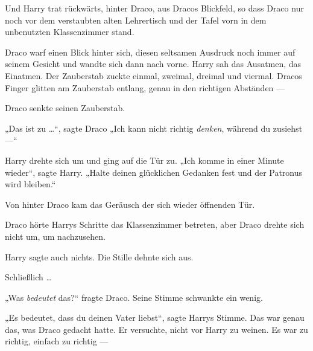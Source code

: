 Und Harry trat rückwärts, hinter Draco, aus Dracos Blickfeld, so dass Draco nur noch vor dem verstaubten alten Lehrertisch und der Tafel vorn in dem unbenutzten Klassenzimmer stand.

Draco warf einen Blick hinter sich, diesen seltsamen Ausdruck noch immer auf seinem Gesicht und wandte sich dann nach vorne. Harry sah das Ausatmen, das Einatmen. Der Zauberstab zuckte einmal, zweimal, dreimal und viermal. Dracos Finger glitten am Zauberstab entlang, genau in den richtigen Abständen —

Draco senkte seinen Zauberstab.

„Das ist zu …“, sagte Draco
„Ich kann nicht richtig \emph{denken}, während du zusiehst —“

Harry drehte sich um und ging auf die Tür zu.
„Ich komme in einer Minute wieder“, sagte Harry.
„Halte deinen glücklichen Gedanken fest und der Patronus wird bleiben.“

\later

Von hinter Draco kam das Geräusch der sich wieder öffnenden Tür.

Draco hörte Harrys Schritte das Klassenzimmer betreten, aber Draco drehte sich nicht um, um nachzusehen.

Harry sagte auch nichts. Die Stille dehnte sich aus.

Schließlich …

„Was \emph{bedeutet} das?“ fragte Draco. Seine Stimme schwankte ein wenig.

„Es bedeutet, dass du deinen Vater liebst“, sagte Harrys Stimme. Das war genau das, was Draco gedacht hatte. Er versuchte, nicht vor Harry zu weinen. Es war zu richtig, einfach zu richtig —

